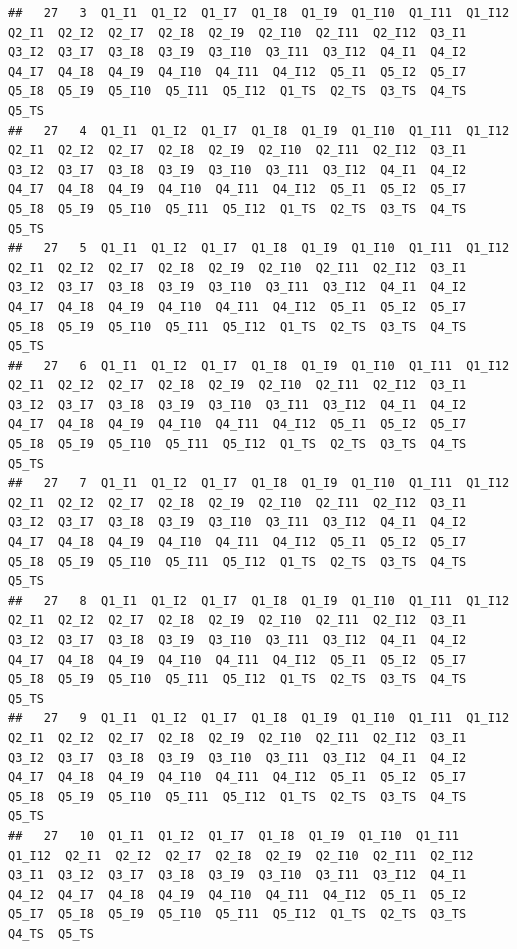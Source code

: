 \documentclass[
]{book}
\begin{document}
\begin{verbatim}
##   27   3  Q1_I1  Q1_I2  Q1_I7  Q1_I8  Q1_I9  Q1_I10  Q1_I11  Q1_I12  Q2_I1  Q2_I2  Q2_I7  Q2_I8  Q2_I9  Q2_I10  Q2_I11  Q2_I12  Q3_I1  Q3_I2  Q3_I7  Q3_I8  Q3_I9  Q3_I10  Q3_I11  Q3_I12  Q4_I1  Q4_I2  Q4_I7  Q4_I8  Q4_I9  Q4_I10  Q4_I11  Q4_I12  Q5_I1  Q5_I2  Q5_I7  Q5_I8  Q5_I9  Q5_I10  Q5_I11  Q5_I12  Q1_TS  Q2_TS  Q3_TS  Q4_TS  Q5_TS
##   27   4  Q1_I1  Q1_I2  Q1_I7  Q1_I8  Q1_I9  Q1_I10  Q1_I11  Q1_I12  Q2_I1  Q2_I2  Q2_I7  Q2_I8  Q2_I9  Q2_I10  Q2_I11  Q2_I12  Q3_I1  Q3_I2  Q3_I7  Q3_I8  Q3_I9  Q3_I10  Q3_I11  Q3_I12  Q4_I1  Q4_I2  Q4_I7  Q4_I8  Q4_I9  Q4_I10  Q4_I11  Q4_I12  Q5_I1  Q5_I2  Q5_I7  Q5_I8  Q5_I9  Q5_I10  Q5_I11  Q5_I12  Q1_TS  Q2_TS  Q3_TS  Q4_TS  Q5_TS
##   27   5  Q1_I1  Q1_I2  Q1_I7  Q1_I8  Q1_I9  Q1_I10  Q1_I11  Q1_I12  Q2_I1  Q2_I2  Q2_I7  Q2_I8  Q2_I9  Q2_I10  Q2_I11  Q2_I12  Q3_I1  Q3_I2  Q3_I7  Q3_I8  Q3_I9  Q3_I10  Q3_I11  Q3_I12  Q4_I1  Q4_I2  Q4_I7  Q4_I8  Q4_I9  Q4_I10  Q4_I11  Q4_I12  Q5_I1  Q5_I2  Q5_I7  Q5_I8  Q5_I9  Q5_I10  Q5_I11  Q5_I12  Q1_TS  Q2_TS  Q3_TS  Q4_TS  Q5_TS
##   27   6  Q1_I1  Q1_I2  Q1_I7  Q1_I8  Q1_I9  Q1_I10  Q1_I11  Q1_I12  Q2_I1  Q2_I2  Q2_I7  Q2_I8  Q2_I9  Q2_I10  Q2_I11  Q2_I12  Q3_I1  Q3_I2  Q3_I7  Q3_I8  Q3_I9  Q3_I10  Q3_I11  Q3_I12  Q4_I1  Q4_I2  Q4_I7  Q4_I8  Q4_I9  Q4_I10  Q4_I11  Q4_I12  Q5_I1  Q5_I2  Q5_I7  Q5_I8  Q5_I9  Q5_I10  Q5_I11  Q5_I12  Q1_TS  Q2_TS  Q3_TS  Q4_TS  Q5_TS
##   27   7  Q1_I1  Q1_I2  Q1_I7  Q1_I8  Q1_I9  Q1_I10  Q1_I11  Q1_I12  Q2_I1  Q2_I2  Q2_I7  Q2_I8  Q2_I9  Q2_I10  Q2_I11  Q2_I12  Q3_I1  Q3_I2  Q3_I7  Q3_I8  Q3_I9  Q3_I10  Q3_I11  Q3_I12  Q4_I1  Q4_I2  Q4_I7  Q4_I8  Q4_I9  Q4_I10  Q4_I11  Q4_I12  Q5_I1  Q5_I2  Q5_I7  Q5_I8  Q5_I9  Q5_I10  Q5_I11  Q5_I12  Q1_TS  Q2_TS  Q3_TS  Q4_TS  Q5_TS
##   27   8  Q1_I1  Q1_I2  Q1_I7  Q1_I8  Q1_I9  Q1_I10  Q1_I11  Q1_I12  Q2_I1  Q2_I2  Q2_I7  Q2_I8  Q2_I9  Q2_I10  Q2_I11  Q2_I12  Q3_I1  Q3_I2  Q3_I7  Q3_I8  Q3_I9  Q3_I10  Q3_I11  Q3_I12  Q4_I1  Q4_I2  Q4_I7  Q4_I8  Q4_I9  Q4_I10  Q4_I11  Q4_I12  Q5_I1  Q5_I2  Q5_I7  Q5_I8  Q5_I9  Q5_I10  Q5_I11  Q5_I12  Q1_TS  Q2_TS  Q3_TS  Q4_TS  Q5_TS
##   27   9  Q1_I1  Q1_I2  Q1_I7  Q1_I8  Q1_I9  Q1_I10  Q1_I11  Q1_I12  Q2_I1  Q2_I2  Q2_I7  Q2_I8  Q2_I9  Q2_I10  Q2_I11  Q2_I12  Q3_I1  Q3_I2  Q3_I7  Q3_I8  Q3_I9  Q3_I10  Q3_I11  Q3_I12  Q4_I1  Q4_I2  Q4_I7  Q4_I8  Q4_I9  Q4_I10  Q4_I11  Q4_I12  Q5_I1  Q5_I2  Q5_I7  Q5_I8  Q5_I9  Q5_I10  Q5_I11  Q5_I12  Q1_TS  Q2_TS  Q3_TS  Q4_TS  Q5_TS
##   27   10  Q1_I1  Q1_I2  Q1_I7  Q1_I8  Q1_I9  Q1_I10  Q1_I11  Q1_I12  Q2_I1  Q2_I2  Q2_I7  Q2_I8  Q2_I9  Q2_I10  Q2_I11  Q2_I12  Q3_I1  Q3_I2  Q3_I7  Q3_I8  Q3_I9  Q3_I10  Q3_I11  Q3_I12  Q4_I1  Q4_I2  Q4_I7  Q4_I8  Q4_I9  Q4_I10  Q4_I11  Q4_I12  Q5_I1  Q5_I2  Q5_I7  Q5_I8  Q5_I9  Q5_I10  Q5_I11  Q5_I12  Q1_TS  Q2_TS  Q3_TS  Q4_TS  Q5_TS

\end{verbatim}
\end{document}
